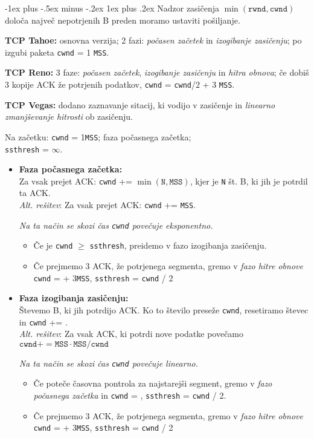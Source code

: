 \documentclass[a4paper,8pt]{extarticle}
\makeatletter
\renewcommand{\subsubsection}{\@startsection{subsubsection}{3}{0mm}%
                                {-1ex plus -.5ex minus -.2ex}%
                                {1ex plus .2ex}%
                                {\normalfont\small\bfseries}}
\makeatother
\begin{document}
\begin{multicols}{4}
\subsubsection{Nadzor zasičenja}
$\min(\texttt{rwnd}, \texttt{cwnd})$ določa največ nepotrjenih B preden moramo ustaviti pošiljanje.

\textbf{TCP Tahoe:} osnovna verzija; 2 fazi: \emph{počasen začetek} in \emph{izogibanje zasičenju}; po izgubi paketa \texttt{cwnd} = 1 \texttt{MSS}.

\textbf{TCP Reno:} 3 faze: \emph{počasen začetek}, \emph{izogibanje zasičenju} in \emph{hitra obnova}; če dobiš 3 kopije ACK že potrjenih podatkov, \texttt{cwnd} = \texttt{cwnd}/2 + 3 \texttt{MSS}.

\textbf{TCP Vegas:} dodano zaznavanje sitacij, ki vodijo v zasičenje in \emph{linearno zmanjševanje hitrosti} ob zasičenju.


Na začetku: \texttt{cwnd} = 1\texttt{MSS}; faza počasnega začetka;\\ \texttt{ssthresh} = $\infty$.


\begin{itemize}
	\item \textbf{Faza počasnega začetka:}\\
	Za vsak prejet ACK: \texttt{cwnd} += $\min(\texttt{N},\texttt{MSS})$, kjer je \texttt{N} št. B, ki jih je potrdil ta ACK. \\
	\emph{Alt. rešitev}: Za vsak prejet ACK:  \texttt{cwnd} += \texttt{MSS}.

	\emph{Na ta način se skozi čas \texttt{cwnd} povečuje eksponentno.}
	\begin{itemize}
		\item Če je \texttt{cwnd} $\geq$ \texttt{ssthresh}, preidemo v fazo izogibanja zasičenju.
		\item Če prejmemo 3 ACK, že potrjenega segmenta, gremo v \emph{fazo hitre obnove} \texttt{cwnd} =  + 3\texttt{MSS}, \texttt{ssthresh} = \texttt{cwnd} / 2
	\end{itemize}
	
	\item \textbf{Faza izogibanja zasičenju:}\\
	Števemo B, ki jih potrdijo ACK. Ko to število preseže \texttt{cwnd}, resetiramo števec in \texttt{cwnd} += . \\
	\emph{Alt. rešitev}: Za vsak ACK, ki potrdi nove podatke povečamo $\texttt{cwnd} += \texttt{MSS}\cdot\texttt{MSS} / \texttt{cwnd}$
	
	\emph{Na ta način se skozi čas \texttt{cwnd} povečuje linearno.}
	\begin{itemize}
		\item Če poteče časovna pontrola za najstarejši segment, gremo v \emph{fazo počasnega začetka} in  \texttt{cwnd} = , \texttt{ssthresh} = \texttt{cwnd} / 2.
		\item Če prejmemo 3 ACK, že potrjenega segmenta, gremo v \emph{fazo hitre obnove} \texttt{cwnd} =  + 3\texttt{MSS}, \texttt{ssthresh} = \texttt{cwnd} / 2
	\end{itemize}
	

\end{itemize}
\end{multicols}
\end{document}
